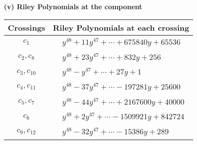 \documentclass[1p]{elsarticle_modified}
\theoremstyle{definition}
\begin{document}
\flushleft \textbf{(v) Riley Polynomials at the component}\newline \\
\begin{tabular}{m{50pt}|m{274pt}}
Crossings & \hspace{64pt}Riley Polynomials at each crossing \\
\hline $$\begin{aligned}c_{1}\end{aligned}$$&$\begin{aligned}
&y^{48}+11 y^{47}+\cdots+675840 y+65536
\end{aligned}$\\
\hline $$\begin{aligned}c_{2},c_{8}\end{aligned}$$&$\begin{aligned}
&y^{48}+23 y^{47}+\cdots+832 y+256
\end{aligned}$\\
\hline $$\begin{aligned}c_{3},c_{10}\end{aligned}$$&$\begin{aligned}
&y^{48}- y^{47}+\cdots+27 y+1
\end{aligned}$\\
\hline $$\begin{aligned}c_{4},c_{11}\end{aligned}$$&$\begin{aligned}
&y^{48}-37 y^{47}+\cdots-197281 y+25600
\end{aligned}$\\
\hline $$\begin{aligned}c_{5},c_{7}\end{aligned}$$&$\begin{aligned}
&y^{48}-44 y^{47}+\cdots+2167600 y+40000
\end{aligned}$\\
\hline $$\begin{aligned}c_{6}\end{aligned}$$&$\begin{aligned}
&y^{48}+2 y^{47}+\cdots-1509921 y+842724
\end{aligned}$\\
\hline $$\begin{aligned}c_{9},c_{12}\end{aligned}$$&$\begin{aligned}
&y^{48}-32 y^{47}+\cdots-15386 y+289
\end{aligned}$\\
\hline
\end{tabular}\\~\\
\end{document}
